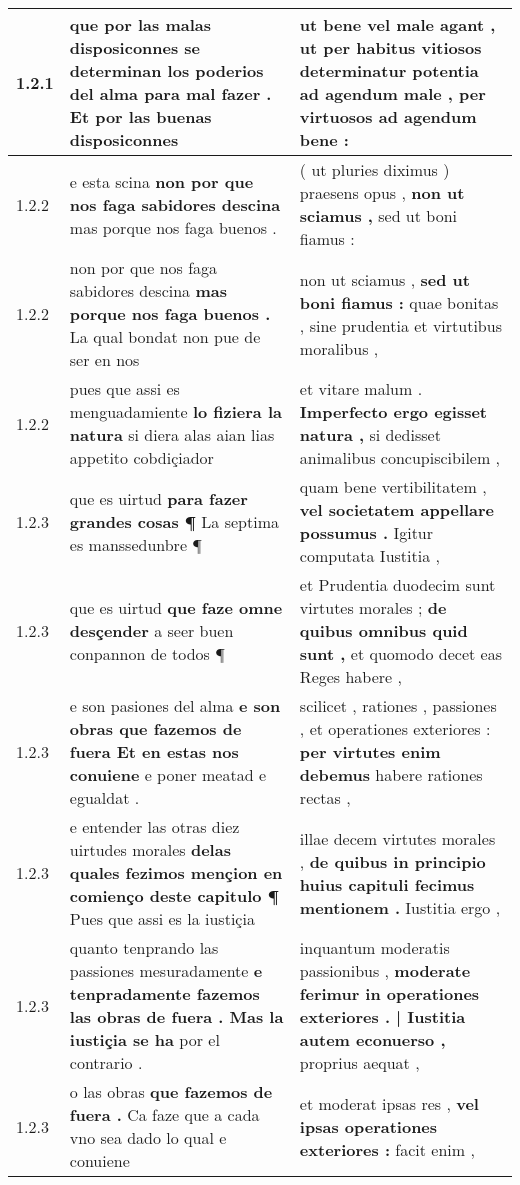 \begin{tabular}{|p{1cm}|p{6.5cm}|p{6.5cm}|}
1.2.1 & que por las malas disposiconnes se determinan los poderios del alma \textbf{ para mal fazer . } Et por las buenas disposiconnes & ut bene vel male agant , \textbf{ ut per habitus vitiosos determinatur potentia ad agendum male , } per virtuosos ad agendum bene : \\\hline
1.2.2 & e esta scina \textbf{ non por que nos faga sabidores descina } mas porque nos faga buenos . & ( ut pluries diximus ) praesens opus , \textbf{ non ut sciamus , } sed ut boni fiamus : \\\hline
1.2.2 & non por que nos faga sabidores descina \textbf{ mas porque nos faga buenos . } La qual bondat non pue de ser en nos & non ut sciamus , \textbf{ sed ut boni fiamus : } quae bonitas , sine prudentia et virtutibus moralibus , \\\hline
1.2.2 & pues que assi es menguadamiente \textbf{ lo fiziera la natura } si diera alas aian lias appetito cobdiçiador & et vitare malum . \textbf{ Imperfecto ergo egisset natura , } si dedisset animalibus concupiscibilem , \\\hline
1.2.3 & que es uirtud \textbf{ para fazer grandes cosas ¶ } La septima es manssedunbre ¶ & quam bene vertibilitatem , \textbf{ vel societatem appellare possumus . } Igitur computata Iustitia , \\\hline
1.2.3 & que es uirtud \textbf{ que faze omne desçender } a seer buen conpannon de todos ¶ & et Prudentia duodecim sunt virtutes morales ; \textbf{ de quibus omnibus quid sunt , } et quomodo decet eas Reges habere , \\\hline
1.2.3 & e son pasiones del alma \textbf{ e son obras que fazemos de fuera Et en estas nos conuiene } e poner meatad e egualdat . & scilicet , rationes , passiones , et operationes exteriores : \textbf{ per virtutes enim debemus } habere rationes rectas , \\\hline
1.2.3 & e entender las otras diez uirtudes morales \textbf{ delas quales fezimos mençion en comienço deste capitulo ¶ } Pues que assi es la iustiçia & illae decem virtutes morales , \textbf{ de quibus in principio huius capituli fecimus mentionem . } Iustitia ergo , \\\hline
1.2.3 & quanto tenprando las passiones mesuradamente \textbf{ e tenpradamente fazemos las obras de fuera . Mas la iustiçia se ha } por el contrario . & inquantum moderatis passionibus , \textbf{ moderate ferimur in operationes exteriores . | Iustitia autem econuerso , } proprius aequat , \\\hline
1.2.3 & o las obras \textbf{ que fazemos de fuera . } Ca faze que a cada vno sea dado lo qual e conuiene & et moderat ipsas res , \textbf{ vel ipsas operationes exteriores : } facit enim , \\\hline

\end{tabular}
